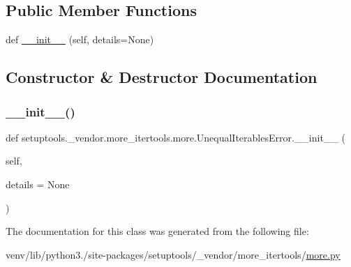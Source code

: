 \subsection*{Public Member Functions}
\begin{DoxyCompactItemize}
\item 
def \hyperlink{classsetuptools_1_1__vendor_1_1more__itertools_1_1more_1_1UnequalIterablesError_aaead318a770368f818a0092874d195ce}{\+\_\+\+\_\+init\+\_\+\+\_\+} (self, details=None)
\end{DoxyCompactItemize}


\subsection{Constructor \& Destructor Documentation}
\mbox{\label{classsetuptools_1_1__vendor_1_1more__itertools_1_1more_1_1UnequalIterablesError_aaead318a770368f818a0092874d195ce}} 
\subsubsection{\texorpdfstring{\+\_\+\+\_\+init\+\_\+\+\_\+()}{\_\_init\_\_()}}
{\footnotesize\ttfamily def setuptools.\+\_\+vendor.\+more\+\_\+itertools.\+more.\+Unequal\+Iterables\+Error.\+\_\+\+\_\+init\+\_\+\+\_\+ (\begin{DoxyParamCaption}\item[{}]{self,  }\item[{}]{details = {\ttfamily None} }\end{DoxyParamCaption})}



The documentation for this class was generated from the following file\+:\begin{DoxyCompactItemize}
\item 
venv/lib/python3./site-\/packages/setuptools/\+\_\+vendor/more\+\_\+itertools/\hyperlink{more_8py}{more.\+py}\end{DoxyCompactItemize}
